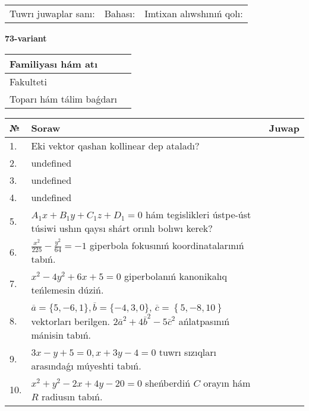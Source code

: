 \documentclass{article}
\begin{document}
\vspace{0.7cm}

\begin{tabular}{lll}
Tuwrı juwaplar sanı: \underline{\hspace{1cm}} & 
Bahası: \underline{\hspace{1cm}} & 
Imtixan alıwshınıń qolı: \underline{\hspace{2cm}} \\
\end{tabular}

\egroup

\newpage


\textbf{73-variant}\\

\bgroup
\def\arraystretch{1.6} %

\begin{tabular}{|m{5.7cm}|m{9.5cm}|}
\hline
Familiyası hám atı & \\
\hline
Fakulteti  & \\
\hline
Toparı hám tálim baǵdarı  & \\
\hline
\end{tabular}

\vspace{0.7cm}

\begin{tabular}{|m{0.7cm}|m{10cm}|m{4cm}|}
\hline
№ & Soraw & Juwap \\
\hline
1. & Eki vektor qashan kollinear dep ataladı? &  \\
\hline
2. & undefined &  \\
\hline
3. & undefined &  \\
\hline
4. & undefined &  \\
\hline
5. & \(A_{1}x + B_{1}y + C_{1}z + D_{1} = 0\) hám tegislikleri ústpe-úst túsiwi ushın qaysı shárt orınlı bolıwı kerek? &  \\
\hline
6. & \(\frac{x^{2}}{225} - \frac{y^{2}}{64} = - 1\) giperbola fokusınıń koordinatalarınıń tabıń. &  \\
\hline
7. & \(x^{2} - 4 y^{2} + 6 x + 5 = 0\) giperbolanıń kanonikalıq teńlemesin dúziń. &  \\
\hline
8. & \(\overline{a} = \{5,- 6, 1 \}, \overline{b} = \{ - 4, 3, 0 \} \), \(\overline{c} = \left\{ 5,- 8, 10 \right\}\) vektorları berilgen. \(2{\bar{a}}^{2} + 4{\bar{b}}^{2} - 5{\bar{c}}^{2}\) ańlatpasınıń mánisin tabıń. &  \\
\hline
9. & \(3 x - y + 5 = 0, x + 3 y - 4 = 0\) tuwrı sızıqları arasındaǵı múyeshti tabıń. &  \\
\hline
10. & \(x^{2} + y^{2} - 2 x + 4 y - 20 = 0\) sheńberdiń \(C\) orayın hám \(R\) radiusın tabıń. & \\
\hline
\end{tabular}
\end{document}
